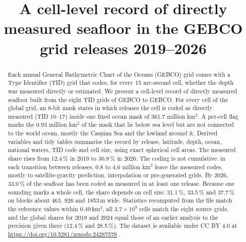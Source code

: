 \documentclass[essd, manuscript]{copernicus}
\newcommand{\datasetdoi}{10.5281/zenodo.24287579}
\renewcommand{\_}{\usorig\allowbreak}
\begin{document}
\title{A cell-level record of directly measured seafloor in the GEBCO grid releases 2019--2026}





\received{}
\pubdiscuss{}
\revised{}
\accepted{}
\published{}


\maketitle

\begin{abstract}
Each annual General Bathymetric Chart of the Oceans (GEBCO) grid comes with a Type Identifier (TID) grid that codes, for every 15 arc-second cell, whether the depth was measured directly or estimated.
We present a cell-level record of directly measured seafloor built from the eight TID grids of GEBCO\_2019 to GEBCO\_2026.
For every cell of the global grid, an 8-bit mask states in which releases the cell is coded as directly measured (TID 10--17) inside one fixed ocean mask of 361.7 million km$^2$.
A per-cell flag marks the 0.93 million km$^2$ of the mask that lie below sea level but are not connected to the world ocean, mostly the Caspian Sea and the lowland around it.
Derived variables and tidy tables summarise the record by release, latitude, depth, ocean, national waters, TID code and cell size, using exact spherical cell areas.
The measured share rises from 12.4\,\% in 2019 to 30.8\,\% in 2026.
The coding is not cumulative: in each transition between releases, 0.8 to 4.6 million km$^2$ leave the measured codes, mostly to satellite-gravity prediction, interpolation or pre-generated grids.
By 2026, 33.0\,\% of the seafloor has been coded as measured in at least one release.
Because one sounding marks a whole cell, the share depends on cell size: 31.1\,\%, 33.5\,\% and 37.7\,\% on blocks about 463, 926 and 1853\,m wide.
Statistics recomputed from the file match the reference values within 0.49\,km$^2$, all $3.7 \times 10^9$ cells match the eight source grids, and the global shares for 2019 and 2024 equal those of an earlier analysis to the precision given there (12.4\,\% and 28.5\,\%).
The dataset is available under CC BY 4.0 at \url{https://doi.org/\datasetdoi} \citep{ismoilov2026data}.
\end{abstract}
\end{document}

